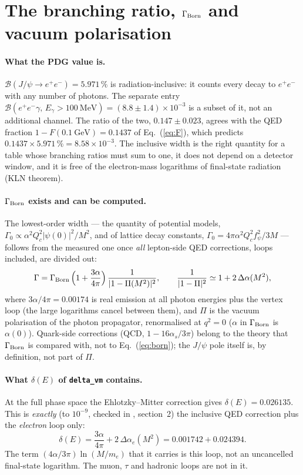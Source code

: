 \documentclass[11pt]{article}
\newcommand{\Jpsi}{J/\psi}
\begin{document}
\section{The branching ratio, $\Gamma_{\rm Born}$ and vacuum polarisation}
\label{sec:born}

\paragraph{What the PDG value is.}
$\mathcal B(\Jpsi\to e^+e^-)=5.971\,\%$ is radiation-inclusive: it counts every
decay to $e^+e^-$ with any number of photons.  The separate entry
$\mathcal B(e^+e^-\gamma,\,E_\gamma>100~\text{MeV})=(8.8\pm1.4)\times10^{-3}$ is a
subset of it, not an additional channel.  The ratio of the two,
$0.147\pm0.023$, agrees with the QED fraction $1-F(0.1~\text{GeV})=0.1437$ of
Eq.~(\ref{eq:F}), which predicts $0.1437\times5.971\,\%=8.58\times10^{-3}$.  The
inclusive width is the right quantity for a table whose branching ratios must sum to
one, it does not depend on a detector window, and it is free of the electron-mass
logarithms of final-state radiation (KLN theorem).

\paragraph{$\Gamma_{\rm Born}$ exists and can be computed.}
The lowest-order width --- the quantity of potential models,
$\Gamma_0\propto\alpha^2Q_c^2|\psi(0)|^2/M^2$, and of lattice decay constants,
$\Gamma_0=4\pi\alpha^2Q_c^2f_\psi^2/3M$ --- follows from the measured one once
\emph{all} lepton-side QED corrections, loops included, are divided out:
\begin{equation}
  \Gamma = \Gamma_{\rm Born}\,\Big(1+\frac{3\alpha}{4\pi}\Big)\,
  \frac{1}{|1-\Pi(M^2)|^2},\qquad
  \frac{1}{|1-\Pi|^2}\simeq 1+2\,\Delta\alpha(M^2),
  \label{eq:born}
\end{equation}
where $3\alpha/4\pi=0.00174$ is real emission at all photon energies plus the vertex
loop (the large logarithms cancel between them), and $\Pi$ is the vacuum polarisation
of the photon propagator, renormalised at $q^2=0$ ($\alpha$ in $\Gamma_{\rm Born}$ is
$\alpha(0)$).  Quark-side corrections (QCD, $1-16\alpha_s/3\pi$) belong to the theory
that $\Gamma_{\rm Born}$ is compared with, not to Eq.~(\ref{eq:born}); the $\Jpsi$
pole itself is, by definition, not part of $\Pi$.

\paragraph{What $\delta(E)$ of \texttt{delta\_vm} contains.}
At the full phase space the Ehlotzky--Mitter correction gives
$\delta(E)=0.026135$.  This is \emph{exactly} (to $10^{-9}$, checked in
, section~2) the inclusive QED correction plus the
\emph{electron} loop only:
\[
  \delta(E)=\frac{3\alpha}{4\pi}+2\,\Delta\alpha_e(M^2)
  =0.001742+0.024394 .
\]
The term $(4\alpha/3\pi)\ln(M/m_e)$ that it carries is this loop, not an uncancelled
final-state logarithm.  The muon, $\tau$ and hadronic loops are not in it.
\end{document}
